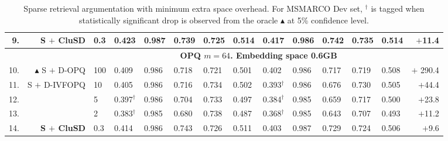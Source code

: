 \begin{table*}[htbp]
{\begin{tabular}{ r r l |l l ll l |llll l|r}
           9. &   \textbf{S $+$ CluSD}  &0.3& 0.423 & 0.987 & 0.739& 0.725 &0.514 & 0.417& 0.986& 0.742&0.735& 0.514  & $+$11.4  \\
             \hline
           & & & \multicolumn{10}{c}{\bf{OPQ $m=64$. Embedding space 0.6GB}}\\
            \hline
           10. & $\blacktriangle$  S $+$ D-OPQ  &100 & 0.409 & 0.986 & 0.718 &  0.721  &0.501 & 0.402 & 0.986 & 0.717 &  0.719 & 0.508 &$+$ 290.4 \\
           11. &   S $+$ D-IVFOPQ &10& 0.405 & 0.986 & 0.716 & 0.734 & 0.502 & 0.393$^\dag$& 0.986& 0.676&0.730& 0.505& $+$44.4 \\
           12. &   &5& 0.397$^\dag$& 0.986 & 0.704 & 0.733  & 0.497 & 0.384$^\dag$& 0.985& 0.659&0.717& 0.500& $+$23.8 \\ 
            13. &  &2& 0.383$^\dag$& 0.985 & 0.680 & 0.738 & 0.487 & 0.368$^\dag$& 0.985 & 0.643&0.707& 0.493 & $+$11.2 \\
            14. &  \textbf{S $+$ CluSD}  &0.3& 0.414 & 0.986 & 0.743& 0.726 & 0.511 & 0.403 & 0.987& 0.729&0.724 & 0.506 & $+$9.6 \\
              \hline\hline
		\end{tabular}
		}
	\caption{
Sparse retrieval argumentation with minimum extra space overhead.
For MSMARCO Dev set, $^\dag$ is tagged when statistically significant drop is observed from the oracle $\blacktriangle$ at 5\% confidence level. 
}
\vspace*{-5mm}
	\label{tab:mainspace}
\end{table*}



